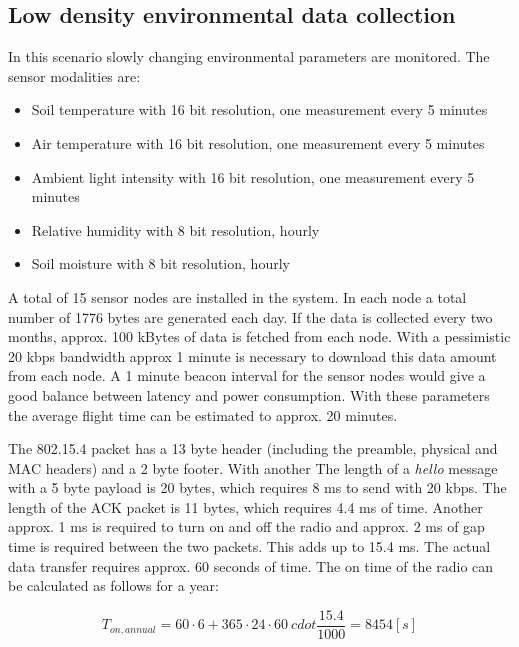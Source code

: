 \documentclass[conference]{IEEEtran}
\begin{document}
\subsection{Low density environmental data collection}

In this scenario slowly changing environmental parameters are monitored. The sensor modalities are:

\begin{itemize}

  \item{Soil temperature with 16 bit resolution, one measurement every 5 minutes}
  \item{Air temperature with 16 bit resolution, one measurement every 5 minutes}
  \item{Ambient light intensity with 16 bit resolution, one measurement every 5 minutes}
  \item{Relative humidity with 8 bit resolution, hourly}
  \item{Soil moisture with 8 bit resolution, hourly}

\end{itemize}

A total of 15 sensor nodes are installed in the system.
In each node a total number of 1776 bytes are generated each day.
If the data is collected every two months, approx.
100 kBytes of data is fetched from each node. With a
pessimistic 20 kbps bandwidth approx 1 minute is
necessary to download this data amount from each node.
A 1 minute beacon interval for the sensor nodes would
give a good balance between latency and power
consumption. With these parameters the average flight
time can be estimated to approx. 20 minutes.

The 802.15.4 packet has a 13 byte header (including the preamble,
physical and MAC headers) and a 2 byte footer. With another
The length of a \emph{hello} message with a 5 byte payload is
20 bytes, which requires 8 ms to send with 20 kbps. The length of
the ACK packet is 11 bytes, which requires 4.4 ms of time.
Another approx. 1
ms is required to turn on and off the radio and approx. 2 ms
of gap time is required between the two packets. This adds up
to 15.4 ms. 
The actual data transfer requires approx. 60 seconds of time.
The on time of the radio can be calculated as follows for a year:

\begin{equation}
    T_{on,annual} = 60 \cdot 6 + 365 \cdot 24 \cdot 60 \ cdot \frac{15.4}{1000} = 8454 [s]
\end{equation}
\end{document}
